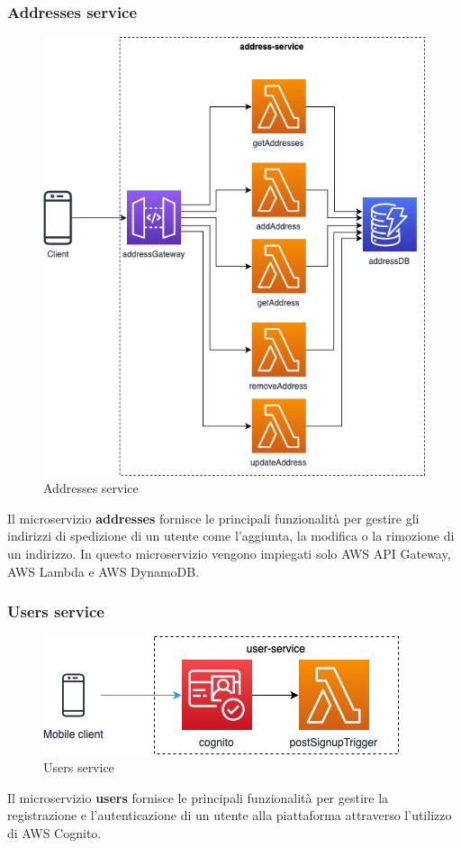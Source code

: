 \subsubsection{Addresses service}
\begin{figure}[H]
	\centering
	\includegraphics[scale=0.4]{Immagini/Backend/AWSAddresses.png}
	\caption{Addresses service}
	\label{fig:Adresses}
\end{figure}
Il microservizio \textbf{addresses} fornisce le principali funzionalità per gestire gli indirizzi di spedizione di un utente come l'aggiunta, la modifica o la rimozione di un indirizzo. In questo microservizio vengono impiegati solo AWS API Gateway, AWS Lambda e AWS DynamoDB.

\subsubsection{Users service}
\begin{figure}[H]
	\centering
	\includegraphics[scale=0.7]{Immagini/Backend/AWSUserService.png}
	\caption{Users service}
	\label{fig:Users}
\end{figure} 
Il microservizio \textbf{users} fornisce le principali funzionalità per gestire la registrazione e l'autenticazione di un utente alla piattaforma attraverso l'utilizzo di AWS Cognito.

